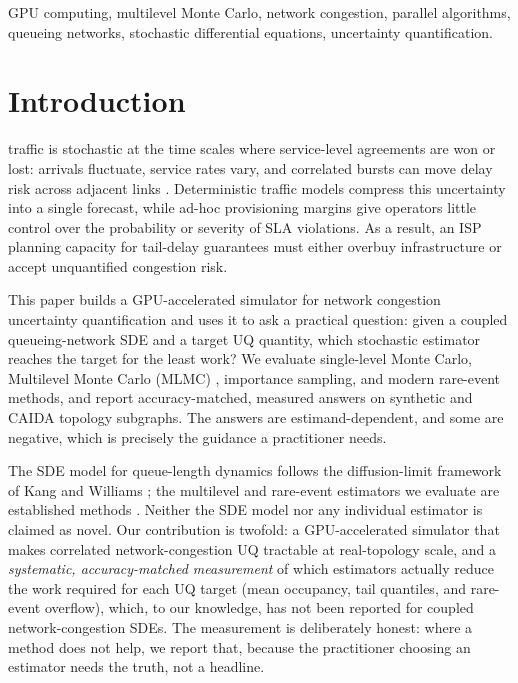 \documentclass{ieeeaccess}
\begin{document}
\begin{keywords}
GPU computing, multilevel Monte Carlo, network congestion, parallel algorithms,
queueing networks, stochastic differential equations, uncertainty quantification.
\end{keywords}

\titlepgskip=-15pt
\maketitle

\section{Introduction}

 traffic is stochastic at the time scales where service-level
agreements are won or lost: arrivals fluctuate, service rates vary, and correlated bursts can
move delay risk across adjacent links \cite{kelly2011stochastic,whitt2002,cisco2023annual}.
Deterministic traffic models compress this uncertainty into a single forecast, while ad-hoc
provisioning margins give operators little control over the probability or severity of SLA
violations. As a result, an ISP planning capacity for tail-delay guarantees must either overbuy
infrastructure or accept unquantified congestion risk.

This paper builds a GPU-accelerated simulator for network congestion uncertainty quantification
and uses it to ask a practical question: given a coupled queueing-network SDE and a target UQ
quantity, which stochastic estimator reaches the target for the least work? We evaluate
single-level Monte Carlo, Multilevel Monte Carlo (MLMC) \cite{heinrich2001multilevel,giles2008multilevel},
importance sampling, and modern rare-event methods, and report accuracy-matched, measured
answers on synthetic and CAIDA topology subgraphs. The answers are estimand-dependent, and some
are negative, which is precisely the guidance a practitioner needs.

The SDE model for queue-length dynamics follows the diffusion-limit framework of Kang and
Williams \cite{kang2007}; the multilevel and rare-event estimators we evaluate are established
methods \cite{giles2008multilevel,cerou2007adaptive,rubinstein2004cross}. Neither the SDE model
nor any individual estimator is claimed as novel. Our contribution is twofold: a GPU-accelerated
simulator that makes correlated network-congestion UQ tractable at real-topology scale, and a
\emph{systematic, accuracy-matched measurement} of which estimators actually reduce the work
required for each UQ target (mean occupancy, tail quantiles, and rare-event overflow), which,
to our knowledge, has not been reported for coupled network-congestion SDEs. The measurement is
deliberately honest: where a method does not help, we report that, because the practitioner
choosing an estimator needs the truth, not a headline.
\end{document}
